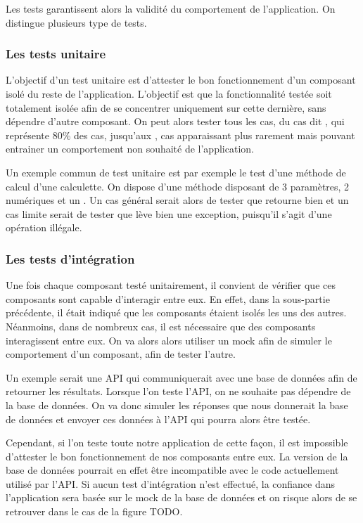 Les tests garantissent alors la validité du comportement de l'application. On distingue plusieurs type de tests.

\subsubsection{Les tests unitaire}

L'objectif d'un test unitaire est d'attester le bon fonctionnement d'un composant isolé du reste de l'application. L'objectif est que la fonctionnalité testée soit totalement isolée afin de se concentrer uniquement sur cette dernière, sans dépendre d'autre composant. On peut alors tester tous les cas, du cas dit , qui représente 80\% des cas, jusqu'aux , cas apparaissant plus rarement mais pouvant entrainer un comportement non souhaité de l'application.

Un exemple commun de test unitaire est par exemple le test d'une méthode de calcul d'une calculette. On dispose d'une méthode  disposant de 3 paramètres, 2  numériques et un . Un cas général serait alors de tester que  retourne bien  et un cas limite serait de tester que  lève bien une exception, puisqu'il s'agit d'une opération illégale.

\subsubsection{Les tests d'intégration}

Une fois chaque composant testé unitairement, il convient de vérifier que ces composants sont capable d'interagir entre eux. En effet, dans la sous-partie précédente, il était indiqué que les composants étaient isolés les uns des autres. Néanmoins, dans de nombreux cas, il est nécessaire que des composants interagissent entre eux. On va alors alors utiliser un \gls{mock} afin de simuler le comportement d'un composant, afin de tester l'autre.

Un exemple serait une \gls{API} qui communiquerait avec une base de données afin de retourner les résultats. Lorsque l'on teste l'\gls{API}, on ne souhaite pas dépendre de la base de données. On va donc simuler les réponses que nous donnerait la base de données et envoyer ces données à l'\gls{API} qui pourra alors être testée.

Cependant, si l'on teste toute notre application de cette façon, il est impossible d'attester le bon fonctionnement de nos composants entre eux. La version de la base de données pourrait en effet être incompatible avec le code actuellement utilisé par l'\gls{API}. Si aucun test d'intégration n'est effectué, la confiance dans l'application sera basée sur le \gls{mock} de la base de données et on risque alors de se retrouver dans le cas de la figure TODO.

